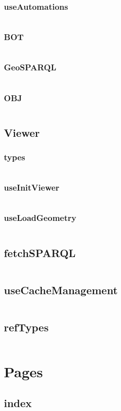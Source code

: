 \subsubsection{useAutomations}
\label{sec:useAutomations.ts}
\inputminted{ts}{figures/snippets/src/modules/automations/useAutomations.ts}
\subsubsection{BOT}
\label{sec:BOT.ts}
\inputminted{ts}{figures/snippets/src/modules/automations/BOT.ts}
\subsubsection{GeoSPARQL}
\label{sec:GeoSPARQL.ts}
\inputminted{ts}{figures/snippets/src/modules/automations/GeoSPARQL.ts}
\subsubsection{OBJ}
\label{sec:OBJ.ts}
\inputminted{ts}{figures/snippets/src/modules/automations/OBJ.ts}
\subsection{Viewer}
\subsubsection{types}
\label{sec:types.ts}
\inputminted{ts}{figures/snippets/src/modules/viewer/types.ts}
\subsubsection{useInitViewer}
\label{sec:useInitViewer.ts}
\inputminted{ts}{figures/snippets/src/modules/viewer/useInitViewer.ts}
\subsubsection{useLoadGeometry}
\label{sec:useLoadGeometry.ts}
\inputminted{ts}{figures/snippets/src/modules/viewer/useLoadGeometry.ts}
\subsection{fetchSPARQL}
\label{sec:fetchSPARQL.ts}
\inputminted{ts}{figures/snippets/src/modules/fetchSPARQL.ts}
\subsection{useCacheManagement}
\label{sec:useCacheManagement.ts}
\inputminted{ts}{figures/snippets/src/modules/useCacheManagement.ts}
\subsection{refTypes}
\label{sec:refTypes.ts}
\inputminted{ts}{figures/snippets/src/modules/refTypes.ts}

\section{Pages}
\subsection{index}
\label{sec:index.tsx}
\inputminted{tsx}{figures/snippets/src/pages/index.tsx}
